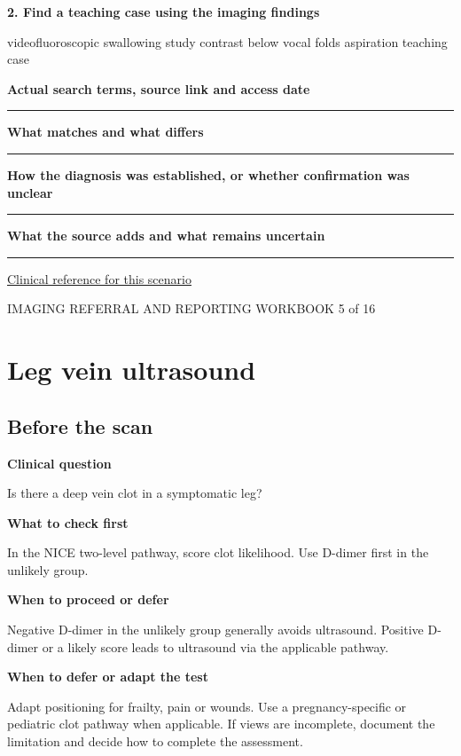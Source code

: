 \documentclass[11pt,a4paper]{article}
\newcommand{\record}[1]{\textbf{#1}\par\vspace{0.55\baselineskip}\hrule\vspace{0.35\baselineskip}}
\begin{document}
\textbf{2. Find a teaching case using the imaging findings}\par videofluoroscopic swallowing study contrast below vocal folds aspiration teaching case\par

\record{Actual search terms, source link and access date}

\record{What matches and what differs}

\record{How the diagnosis was established, or whether confirmation was unclear}

\record{What the source adds and what remains uncertain}

\small\href{https://acsearch.acr.org/docs/69471/Narrative}{Clinical reference for this scenario}

\normalsize

\newpage

{\small IMAGING REFERRAL AND REPORTING WORKBOOK \hfill 5 of 16}

\section*{Leg vein ultrasound}

\subsection*{Before the scan}

\textbf{Clinical question}\par Is there a deep vein clot in a symptomatic leg?\par

\textbf{What to check first}\par In the NICE two-level pathway, score clot likelihood. Use D-dimer first in the unlikely group.\par

\textbf{When to proceed or defer}\par Negative D-dimer in the unlikely group generally avoids ultrasound. Positive D-dimer or a likely score leads to ultrasound via the applicable pathway.\par

\textbf{When to defer or adapt the test}\par Adapt positioning for frailty, pain or wounds. Use a pregnancy-specific or pediatric clot pathway when applicable. If views are incomplete, document the limitation and decide how to complete the assessment.\par
\end{document}
